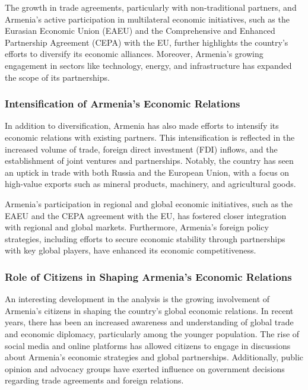 \documentclass[
]{article}
\begin{document}
The growth in trade agreements, particularly with non-traditional
partners, and Armenia's active participation in multilateral economic
initiatives, such as the Eurasian Economic Union (EAEU) and the
Comprehensive and Enhanced Partnership Agreement (CEPA) with the EU,
further highlights the country's efforts to diversify its economic
alliances. Moreover, Armenia's growing engagement in sectors like
technology, energy, and infrastructure has expanded the scope of its
partnerships.

\subsubsection{Intensification of Armenia's Economic
Relations}\label{intensification-of-armenias-economic-relations}

In addition to diversification, Armenia has also made efforts to
intensify its economic relations with existing partners. This
intensification is reflected in the increased volume of trade, foreign
direct investment (FDI) inflows, and the establishment of joint ventures
and partnerships. Notably, the country has seen an uptick in trade with
both Russia and the European Union, with a focus on high-value exports
such as mineral products, machinery, and agricultural goods.

Armenia's participation in regional and global economic initiatives,
such as the EAEU and the CEPA agreement with the EU, has fostered closer
integration with regional and global markets. Furthermore, Armenia's
foreign policy strategies, including efforts to secure economic
stability through partnerships with key global players, have enhanced
its economic competitiveness.

\subsubsection{Role of Citizens in Shaping Armenia's Economic
Relations}\label{role-of-citizens-in-shaping-armenias-economic-relations}

An interesting development in the analysis is the growing involvement of
Armenia's citizens in shaping the country's global economic relations.
In recent years, there has been an increased awareness and understanding
of global trade and economic diplomacy, particularly among the younger
population. The rise of social media and online platforms has allowed
citizens to engage in discussions about Armenia's economic strategies
and global partnerships. Additionally, public opinion and advocacy
groups have exerted influence on government decisions regarding trade
agreements and foreign relations.
\end{document}
